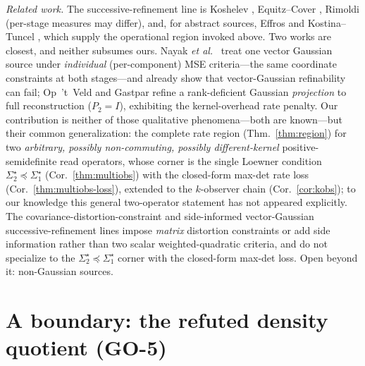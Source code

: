 \documentclass[lettersize,onecolumn]{IEEEtran}
\theoremstyle{definition}
\theoremstyle{remark}
\begin{document}
\emph{Related work.} The successive-refinement line is Koshelev \cite{koshelev},
Equitz--Cover \cite{equitzcover}, Rimoldi \cite{rimoldi} (per-stage measures may
differ), and, for abstract sources, Effros \cite{effros} and Kostina--Tuncel
\cite{kostinatuncel}, which supply the operational region invoked above. Two works are
closest, and neither subsumes ours. Nayak \emph{et al.}~\cite{nayaktuncel} treat one
vector Gaussian source under \emph{individual} (per-component) MSE criteria---the same
coordinate constraints at both stages---and already show that vector-Gaussian
refinability can fail; Op~'t~Veld and Gastpar \cite{optveld} refine a rank-deficient
Gaussian \emph{projection} to full reconstruction ($P_2=I$), exhibiting the
kernel-overhead rate penalty. Our contribution is neither of those qualitative
phenomena---both are known---but their common generalization: the complete rate region
(Thm.~\ref{thm:region}) for two \emph{arbitrary, possibly non-commuting, possibly
different-kernel} positive-semidefinite read operators, whose corner is the single Loewner
condition $\Sigma_2^\star\preceq\Sigma_1^\star$ (Cor.~\ref{thm:multiobs}) with the
closed-form max-det rate loss (Cor.~\ref{thm:multiobs-loss}), extended to the $k$-observer
chain (Cor.~\ref{cor:kobs}); to our knowledge this general two-operator statement has not
appeared explicitly. The covariance-distortion-constraint and side-informed vector-Gaussian
successive-refinement lines \cite{xuSR,zahedi} impose \emph{matrix} distortion constraints
or add side information rather than two scalar weighted-quadratic criteria, and do not
specialize to the $\Sigma_2^\star\preceq\Sigma_1^\star$ corner with the closed-form max-det
loss. Open beyond it: non-Gaussian sources.

\section{A boundary: the refuted density quotient (GO-5)}\label{sec:boundary}
\end{document}
